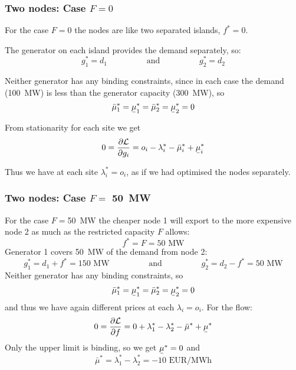 \documentclass[10pt,aspectratio=169,dvipsnames]{beamer}
\def\l{\lambda}
\def\m{\mu}
\def\d{\partial}
\def\cL{\mathcal{L}}
\newcommand{\ubar}[1]{\text{\b{$#1$}}}
\begin{document}
\begin{frame}[fragile]
  \frametitle{Two nodes: Case $F = 0$ }

  For the case $F = 0$ the nodes are like two separated islands, $f^* = 0$.

  The generator on each island provides the demand separately, so:
  \begin{equation*}
    g_1^* = d_1  \hspace{2cm} \textrm{and} \hspace{2cm} g_2^* = d_2
  \end{equation*}

  Neither generator has any binding constraints, since in each case the demand (100~MW) is less than the generator capacity (300~MW), so
  \begin{equation*}
    \bar{\m}_1^* = \ubar{\m}_1^* =     \bar{\m}_2^* = \ubar{\m}_2^* = 0
  \end{equation*}

  From stationarity for each site we get
  \begin{equation*}
    0 = \frac{\d \cL}{\d g_{i}} = o_i - \l_i^*  -  \bar{\m}_i^* + \ubar{\m}_i^*
  \end{equation*}

  Thus we have at each site $\l_i^* = o_i$, as if we had optimised the nodes separately.


\end{frame}


\begin{frame}[fragile]
  \frametitle{Two nodes: Case $F =$ 50~MW }

  For the case $F = $50~MW the cheaper node 1 will export to the more
  expensive node 2 as much as the restricted capacity $F$ allows:
  \begin{equation*}
    f^* = F = 50\textrm{ MW}
  \end{equation*}
  Generator 1 covers 50~MW of the demand from node 2:
  \begin{equation*}
    g_1^* = d_1+f^* = 150\textrm{ MW}  \hspace{2cm} \textrm{and} \hspace{2cm} g_2^* = d_2 - f^* = 50\textrm{ MW}
  \end{equation*}
  Neither generator has any binding constraints, so
  \begin{equation*}
    \bar{\m}_1^* = \ubar{\m}_1^* =     \bar{\m}_2^* = \ubar{\m}_2^* = 0
  \end{equation*}
  and thus we have again different prices at each $\l_i = o_i$. For the flow:
  \begin{equation*}
    0 = \frac{\d \cL}{\d f} = 0 +  \l_1^* - \l_2^*  -  \bar{\m}^* + \ubar{\m}^*
  \end{equation*}
  Only the upper limit is binding, so we get $\ubar{\m}^* = 0$ and
  \begin{equation*}
    \bar{\m}^* = \l_1^* - \l_2^* = -10 \textrm{ EUR/MWh}
  \end{equation*}


\end{frame}
\end{document}
